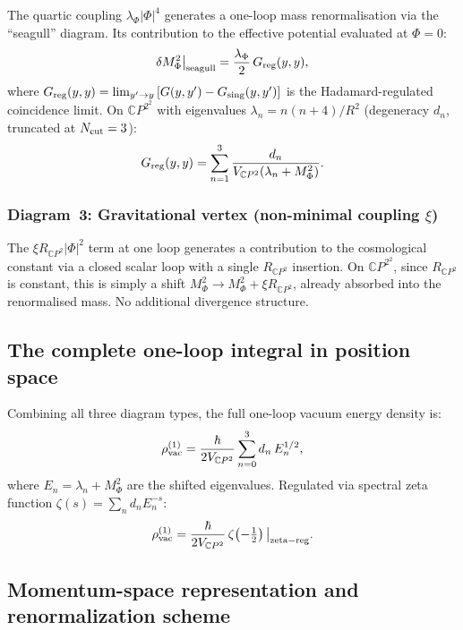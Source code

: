 \documentclass[11pt]{article}
\newcommand{\CP}{\mathbb{C}P^2}
\begin{document}
The quartic coupling $\lambda_\Phi|\Phi|^4$ generates a one-loop mass
renormalisation via the ``seagull'' diagram.  Its contribution to the effective
potential evaluated at $\Phi = 0$:
\begin{equation}
  \delta M_\Phi^2\big|_{\rm seagull} = \frac{\lambda_\Phi}{2}\,G_{\rm reg}(y,y),
\end{equation}
where $G_{\rm reg}(y,y) = \lim_{y'\to y}\,[G(y,y') - G_{\rm sing}(y,y')]$
is the Hadamard-regulated coincidence limit.  On $\CP^2$ with eigenvalues
$\lambda_n = n(n+4)/R^2$ (degeneracy $d_n$, truncated at $N_{\rm cut}=3$):
\begin{equation}
  G_{\rm reg}(y,y) = \sum_{n=1}^{3}
  \frac{d_n}{V_{\CP}(\lambda_n + M_\Phi^2)}.
\end{equation}

\subsubsection{Diagram~3: Gravitational vertex (non-minimal coupling $\xi$)}

The $\xi R_{\CP}|\Phi|^2$ term at one loop generates a contribution to the
cosmological constant via a closed scalar loop with a single $R_{\CP}$
insertion.  On $\CP^2$, since $R_{\CP}$ is constant, this is simply a shift
$M_\Phi^2 \to M_\Phi^2 + \xi R_{\CP}$, already absorbed into the renormalised
mass.  No additional divergence structure.

\subsection{The complete one-loop integral in position space}

Combining all three diagram types, the full one-loop vacuum energy density is:
\begin{equation}\label{eq:full-1loop}
  \rho_{\rm vac}^{(1)} = \frac{\hbar}{2V_{\CP}}
  \sum_{n=0}^{3} d_n \, E_n^{1/2},
\end{equation}
where $E_n = \lambda_n + M_\Phi^2$ are the shifted eigenvalues.  Regulated
via spectral zeta function $\zeta(s) = \sum_n d_n E_n^{-s}$:
\begin{equation}
  \rho_{\rm vac}^{(1)} = \frac{\hbar}{2V_{\CP}}\,
  \zeta\!\left(-\tfrac{1}{2}\right)\big|_{\rm zeta-reg}.
\end{equation}

\subsection{Momentum-space representation and renormalization scheme}
\end{document}
